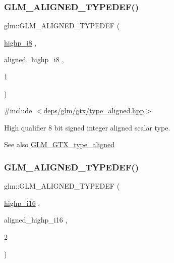 \subsubsection{\texorpdfstring{G\+L\+M\+\_\+\+A\+L\+I\+G\+N\+E\+D\+\_\+\+T\+Y\+P\+E\+D\+E\+F()}{GLM\_ALIGNED\_TYPEDEF()}\hspace{0.1cm}{\footnotesize\ttfamily [33/209]}}
{\footnotesize\ttfamily glm\+::\+G\+L\+M\+\_\+\+A\+L\+I\+G\+N\+E\+D\+\_\+\+T\+Y\+P\+E\+D\+EF (\begin{DoxyParamCaption}\item[{\hyperlink{group__gtc__type__precision_ga8b9eb0b24cce7f14478bfcacb53ce839}{highp\+\_\+i8}}]{,  }\item[{aligned\+\_\+highp\+\_\+i8}]{,  }\item[{1}]{ }\end{DoxyParamCaption})}



{\ttfamily \#include $<$\hyperlink{gtx_2type__aligned_8hpp}{deps/glm/gtx/type\+\_\+aligned.\+hpp}$>$}

High qualifier 8 bit signed integer aligned scalar type. \begin{DoxySeeAlso}{See also}
\hyperlink{group__gtx__type__aligned}{G\+L\+M\+\_\+\+G\+T\+X\+\_\+type\+\_\+aligned} 
\end{DoxySeeAlso}
\mbox{\label{group__gtx__type__aligned_gae6d384de17588d8edb894fbe06e0d410}} 
\subsubsection{\texorpdfstring{G\+L\+M\+\_\+\+A\+L\+I\+G\+N\+E\+D\+\_\+\+T\+Y\+P\+E\+D\+E\+F()}{GLM\_ALIGNED\_TYPEDEF()}\hspace{0.1cm}{\footnotesize\ttfamily [34/209]}}
{\footnotesize\ttfamily glm\+::\+G\+L\+M\+\_\+\+A\+L\+I\+G\+N\+E\+D\+\_\+\+T\+Y\+P\+E\+D\+EF (\begin{DoxyParamCaption}\item[{\hyperlink{group__gtc__type__precision_gaa04399853952dbce29cb62e2432f350a}{highp\+\_\+i16}}]{,  }\item[{aligned\+\_\+highp\+\_\+i16}]{,  }\item[{2}]{ }\end{DoxyParamCaption})}



